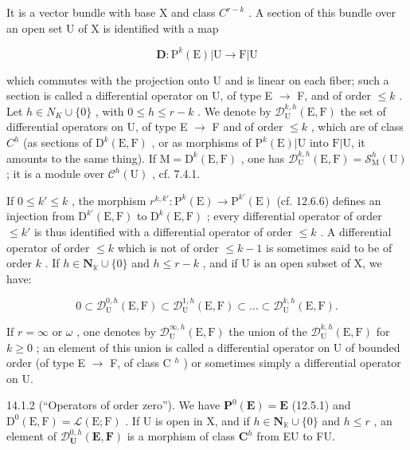 It is a vector bundle with base X and class \(C^{r-k}\) . A section of this bundle over an open set U of X is identified with a map

\[
\mathbf {D}: \mathrm{P} ^ {k} (\mathrm{E}) | \mathrm{U} \rightarrow \mathrm{F} | \mathrm{U}
\]

which commutes with the projection onto U and is linear on each fiber; such a section is called a differential operator on U, of type E \(\to\) F, and of order \(\leqslant k\) . Let \(h \in N_{K} \cup \{0\}\) , with \(0 \leqslant h \leqslant r-k\) . We denote by \(\mathcal{D}_{\mathrm{U}}^{k,h}(\mathrm{E}, \mathrm{F})\) the set of differential operators on U, of type E \(\to\) F and of order \(\leqslant k\) , which are of class \(C^{h}\) (as sections of \(\mathrm{D}^{k}(\mathrm{E}, \mathrm{F})\) , or as morphisms of \(\mathrm{P}^{k}(\mathrm{E})|\mathrm{U}\) into \(\mathrm{F}|\mathrm{U}\), it amounts to the same thing). If \(\mathrm{M} = \mathrm{D}^{k}(\mathrm{E}, \mathrm{F})\) , one has \(\mathcal{D}_{\mathrm{U}}^{k,h}(\mathrm{E}, \mathrm{F}) = \mathcal{S}_{\mathrm{M}}^{h}(\mathrm{U})\) ; it is a module over \(\mathcal{C}^{h}(\mathrm{U})\) , cf. 7.4.1.

If \(0 \leqslant k' \leqslant k\) , the morphism \(r^{k, k'}: \mathrm{P}^{k}(\mathrm{E}) \to \mathrm{P}^{k'}(\mathrm{E})\) (cf. 12.6.6) defines an injection from \(\mathrm{D}^{k'}(\mathrm{E}, \mathrm{F})\) to \(\mathrm{D}^{k}(\mathrm{E}, \mathrm{F})\) ; every differential operator of order \(\leqslant k'\) is thus identified with a differential operator of order \(\leqslant k\) . A differential operator of order \(\leqslant k\) which is not of order \(\leqslant k - 1\) is sometimes said to be of order \(k\) . If \(h \in \mathbf{N}_{\mathbb{K}} \cup \{0\}\) and \(h \leqslant r - k\) , and if U is an open subset of X, we have:

\[
0 \subset \mathcal {D} _ {\mathrm{U}} ^ {0, h} (\mathrm{E}, \mathrm{F}) \subset \mathcal {D} _ {\mathrm{U}} ^ {1, h} (\mathrm{E}, \mathrm{F}) \subset \dots \subset \mathcal {D} _ {\mathrm{U}} ^ {k, h} (\mathrm{E}, \mathrm{F}).
\]

If \(r=\infty\) or \(\omega\) , one denotes by \(\mathcal{D}_{\mathrm{U}}^{\infty,h}(\mathrm{E},\mathrm{F})\) the union of the \(\mathcal{D}_{\mathrm{U}}^{k,h}(\mathrm{E},\mathrm{F})\) for \(k\geqslant0\) ; an element of this union is called a differential operator on U of bounded order (of type E \(\rightarrow\) F, of class C \(^{h}\) ) or sometimes simply a differential operator on U.

14.1.2 (“Operators of order zero”). We have \(\mathbf{P}^0 (\mathbf{E}) = \mathbf{E}\) (12.5.1) and \(\mathrm{D}^0 (\mathrm{E},\mathrm{F}) = \mathcal{L}(\mathrm{E};\mathrm{F})\) . If U is open in X, and if \(h\in \mathbf{N}_{\mathbb{K}}\cup \{0\}\) and \(h\leqslant r\) , an element of \(\mathcal{D}_{\mathbf{U}}^{0,h}(\mathbf{E},\mathbf{F})\) is a morphism of class \(\mathbf{C}^h\) from E\textbar U to F\textbar U.


